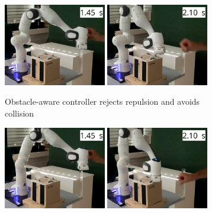 \
\else
\begin{figure}
    \centering
   \begin{subfigure}{\columnwidth}
    \includegraphics[width=0.49\textwidth]{figures/franka_sequence/franka_obstacle_aware016}\hfill%
    \includegraphics[width=0.49\textwidth]{figures/franka_sequence/franka_obstacle_aware020}
      \caption{Obstacle-aware controller rejects repulsion and avoids collision}
      \label{fig:franka_sequence_obstacle_aware}
    \end{subfigure}
	\begin{subfigure}{\columnwidth}
    \includegraphics[width=0.49\textwidth]{figures/franka_sequence/franka_velocity_conserving021}\hfill%
    \includegraphics[width=0.49\textwidth]{figures/franka_sequence/franka_velocity_conserving025}\hfill%

\end{subfigure}
\end{figure}
